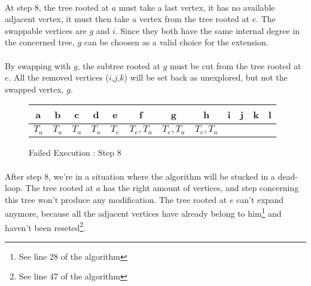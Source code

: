 \paragraph{}
At step 8, the tree rooted at $a$ must take a last vertex, it has no available
adjacent vertex, it must then take a vertex from the tree rooted at $e$. The
swappable vertices are $g$ and $i$. Since they both have the
same internal degree in the concerned tree, $g$ can be choosen as a valid
choice for the extension.

\paragraph{}
By swapping with $g$, the subtree rooted at $g$ must be cut from the tree
rooted at $e$. All the removed vertices ($i$,$j$,$k$) will be set back as
unexplored, but not the swapped vertex, $g$.

\begin{figure}[H]
  \caption{Failed Execution : Step 8}
  \begin{center}
    \begin{tikzpicture}[scale=0.9,transform shape]
      
    \end{tikzpicture}
    \begin{tabular}{|c|c|c|c|c|c|c|c|c|c|c|c|}
\hline
a & b & c & d & e & f & g & h & i & j & k & l\\
\hline
$T_a$ & $T_a$ & $T_a$ & $T_a$ & $T_e$ & $T_e, T_a$ & $T_e,T_a$ & $T_e, T_a$ & & &  &\\
\hline
    \end{tabular}
  \end{center}
\end{figure}

\paragraph{}
After step 8, we're in a situation where the algorithm will be stucked in a
dead-loop. The tree rooted at $a$ has the right amount of vertices, and step
concerning this tree won't produce any modification. The tree rooted at $e$
can't expand anymore, because all the adjacent vertices have already belong to
him\footnote{See line 28 of the algorithm} and haven't been reseted\footnote{
See line 47 of the algorithm}.
